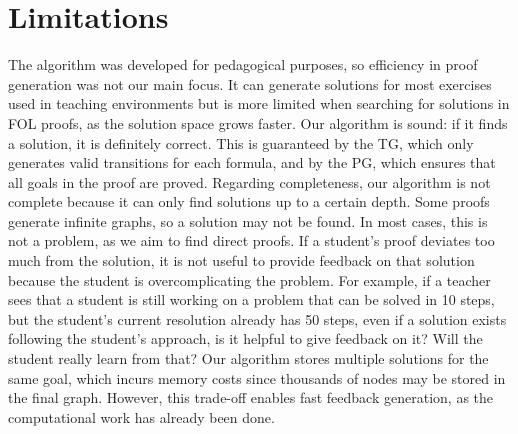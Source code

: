 \section{Limitations}
The algorithm was developed for pedagogical purposes, so efficiency in proof generation was not our main focus. It can generate solutions for most exercises used in teaching environments but is more limited when searching for solutions in FOL proofs, as the solution space grows faster. Our algorithm is sound: if it finds a solution, it is definitely correct. This is guaranteed by the TG, which only generates valid transitions for each formula, and by the PG, which ensures that all goals in the proof are proved.  Regarding completeness, our algorithm is not complete because it can only find solutions up to a certain depth. Some proofs generate infinite graphs, so a solution may not be found. In most cases, this is not a problem, as we aim to find direct proofs. If a student’s proof deviates too much from the solution, it is not useful to provide feedback on that solution because the student is overcomplicating the problem. For example, if a teacher sees that a student is still working on a problem that can be solved in 10 steps, but the student’s current resolution already has 50 steps, even if a solution exists following the student’s approach, is it helpful to give feedback on it? Will the student really learn from that? Our algorithm stores multiple solutions for the same goal, which incurs memory costs since thousands of nodes may be stored in the final graph. However, this trade-off enables fast feedback generation, as the computational work has already been done.